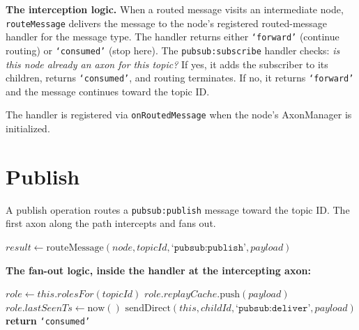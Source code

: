 \documentclass[twoside,nobib]{tufte-book}
\begin{document}
\textbf{The interception logic.} When a routed message visits an
intermediate node, \texttt{routeMessage} delivers the message to
the node's registered routed-message handler for the message
type. The handler returns either \texttt{`forward'} (continue
routing) or \texttt{`consumed'} (stop here). The
\texttt{pubsub:subscribe} handler checks: \emph{is this node
already an axon for this topic?} If yes, it adds the subscriber
to its children, returns \texttt{`consumed'}, and routing
terminates. If no, it returns \texttt{`forward'} and the message
continues toward the topic ID.

The handler is registered via \texttt{onRoutedMessage} when the
node's AxonManager is initialized.

\section{Publish}

A publish operation routes a \texttt{pubsub:publish} message
toward the topic ID. The first axon along the path intercepts and
fans out.

\begin{algorithm}
\caption{publish(node, topicId, payload)}
\begin{algorithmic}[1]
\State $\mathit{result} \gets
        \mathrm{routeMessage}(\mathit{node},
        \mathit{topicId},
        \texttt{`pubsub:publish'},
        \mathit{payload})$
\end{algorithmic}
\end{algorithm}

\textbf{The fan-out logic, inside the handler at the intercepting axon:}

\begin{algorithm}
\caption{publish handler at an axon}
\begin{algorithmic}[1]
\State $\mathit{role} \gets \mathit{this}.\mathit{rolesFor}(\mathit{topicId})$
\State $\mathit{role}.\mathit{replayCache}.\mathrm{push}(\mathit{payload})$
\State $\mathit{role}.\mathit{lastSeenTs} \gets \mathrm{now}()$
  \State $\mathrm{sendDirect}(\mathit{this},
         \mathit{childId},
         \texttt{`pubsub:deliver'},
         \mathit{payload})$
\EndFor
\State \textbf{return} \texttt{`consumed'}
\end{algorithmic}
\end{algorithm}
\end{document}
